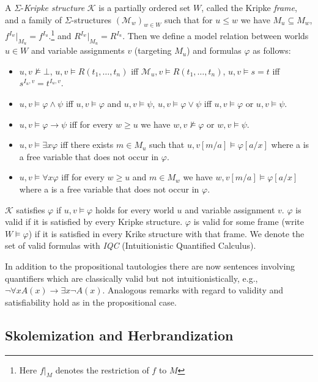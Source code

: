 \documentclass[a4paper,UKenglish,cleveref, autoref, thm-restate]{lipics-v2021}
\begin{document}
\begin{definition}
A $\Sigma$-\emph{Kripke structure} $\mathcal{K}$ is a partially ordered set $W$, called the Kripke \emph{frame}, and a family of $\Sigma$-structures $(\mathcal{M}_w)_{w\in W}$ such that for $u\leq w$ we have $M_u\subseteq M_w$, $f^{I_w}|_{M_u} = f^{I_u}$.\footnote{Here $f|_M$ denotes the restriction of $f$ to $M$} and $R^{I_w}|_{M_u} = R^{I_u}$.
	Then we define a model relation between worlds $u\in W$ and variable assignments $v$ (targeting $M_u$) and formulas $\varphi$ as follows:
	\begin{itemize}
		\item $u, v\not\models\bot$, $u, v\models R(t_1,\dots,t_n)$ iff $\mathcal M_u, v\models R(t_1,\dots,t_n)$, $u, v\models s = t$ iff $s^{I_u, v} = t^{I_u, v}$.
		\item $u, v\models \varphi\wedge \psi$ iff $u, v\models\varphi$ and $u, v\models\psi$, $u, v\models \varphi\vee\psi$ iff $u, v\models\varphi$ or $u, v\models\psi$.
		\item $u, v\models \varphi\to\psi$ iff for every $w\geq u$ we have $w, v\not\models\varphi$ or $w, v\models\psi$.
		\item $u, v\models\exists x\varphi$ iff there exists $m\in M_u$ such that $u, v[m/a]\models\varphi[a/x]$ where a is a free variable that does not occur in $\varphi$.
		\item $u, v\models\forall x\varphi$ iff for every $w\geq u$ and $m\in M_w$ we have $w, v[m/a]\models\varphi[a/x]$ where a is a free variable that does not occur in $\varphi$.
	\end{itemize}
	$\mathcal{K}$ satisfies $\varphi$ if $u, v\models\varphi$ holds for every world $u$ and variable assignment $v$. $\varphi$ is valid if it is satisfied by every Kripke structure.
$\varphi$ is valid for some frame (write $W\models\varphi$) if it is satisfied in every Krike structure with that frame. We denote the set of valid formulas with \emph{IQC} (Intuitionistic Quantified Calculus).
\end{definition}
In addition to the propositional tautologies there are now sentences involving quantifiers which are classically valid but not intuitionistically, e.g., $\neg\forall x A(x)\to \exists x \neg A(x)$.
Analogous remarks with regard to validity and satisfiability hold as in the propositional case.

\subsection{Skolemization and Herbrandization}
\end{document}
